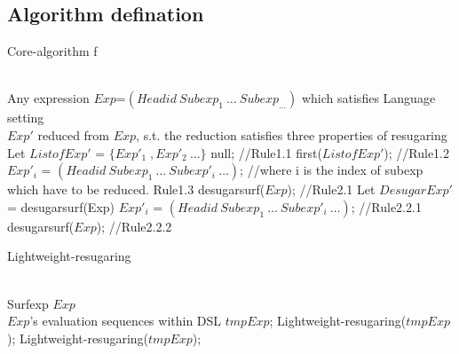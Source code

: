 \subsection{Algorithm defination}

\begin{algorithm}
	\caption{Core-algorithm f}
	\label{alg:f}     %
	\begin{algorithmic}[1]       %
		\REQUIRE ~~\\      %
		Any expression $Exp$=$(Headid~Subexp_{1}~\ldots~Subexp_{\ldots})$ which satisfies Language setting
		\ENSURE ~~\\     %
		$Exp'$ reduced from $Exp$, s.t. the reduction satisfies three properties of resugaring
		\STATE     Let $ListofExp'$ = $\{Exp'_{1}\;,Exp'_{2}~\ldots\}$
		\RETURN null; //\hfill Rule1.1
		\RETURN first($ListofExp'$); //\hfill Rule1.2
		\ELSE 
		\RETURN $Exp'_{i}$ = $(Headid~Subexp_{1}~\ldots~Subexp'_{i}~\ldots)$; //where i is the index of subexp which have to be reduced. \hfill Rule1.3
		\ENDIF
		\ELSE 
		\RETURN desugarsurf($Exp$); //\hfill Rule2.1
		\ELSE
		\STATE Let $DesugarExp'$ = desugarsurf(Exp)
		\RETURN $Exp'_{i}$ = $(Headid~Subexp_{1}~\ldots~Subexp'_{i}~\ldots)$; //\hfill Rule2.2.1
		\ELSE
		\RETURN desugarsurf($Exp$); //\hfill Rule2.2.2
		\ENDIF
		\ENDIF
		\ENDIF
		
	\end{algorithmic}
\end{algorithm}

\begin{algorithm}
	\caption{Lightweight-resugaring}
	\label{alg:lwresugar}     %
	\begin{algorithmic}[1]       %
		\REQUIRE ~~\\      %
		Surfexp $Exp$
		\ENSURE ~~\\     %
		$Exp$'s evaluation sequences within DSL
		\RETURN
		\PRINT $tmpExp$;
		\STATE Lightweight-resugaring($tmpExp$);
		\ELSE 
		\STATE Lightweight-resugaring($tmpExp$);
		\ENDIF
		\ENDWHILE
		
	\end{algorithmic}
\end{algorithm}
